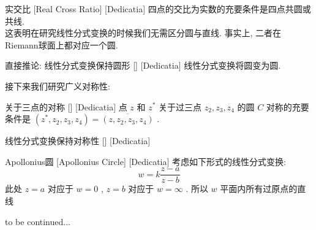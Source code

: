 \documentclass[UTF8]{ctexart}
\newcommand{\continued}{{\Large to be continued...}}
\begin{document}
\begin{ppt}
    [UUID]
    {实交比}
    [Real Cross Ratio]
    [Dedicatia]
    四点的交比为实数的充要条件是四点共圆或共线. \\
    这表明在研究线性分式变换的时候我们无需区分圆与直线. 事实上, 二者在Riemann球面上都对应一个圆. 
\end{ppt}
\begin{ppt}
    [UUID]
    {直接推论: 线性分式变换保持圆形}
    []
    [Dedicatia]
    线性分式变换将圆变为圆. 
\end{ppt}
接下来我们研究广义对称性: 
\begin{ppt}
    [UUID]
    {关于三点的对称}
    []
    [Dedicatia]
    点 \( z \) 和 \( z^* \) 关于过三点 \( z_2,z_3,z_4 \) 的圆 \( C \) 对称的充要条件是 \( (z^*,z_2,z_3,z_4)=\overline{(z,z_2,z_3,z_4)} \) .
\end{ppt}
\begin{ppt}
    [UUID]
    {线性分式变换保持对称性}
    []
    [Dedicatia]
\end{ppt}
\begin{dfn}
    [UUID]
    {Apollonius圆}
    [Apollonius Circle]
    [Dedicatia]
    考虑如下形式的线性分式变换: 
    \[w=k\frac{z-a}{z-b}\]
    此处 \( z=a \) 对应于 \( w=0 \) ,  \( z=b \) 对应于 \( w=\infty \) . 所以 \( w \) 平面内所有过原点的直线
\end{dfn}
\continued
\end{document}
